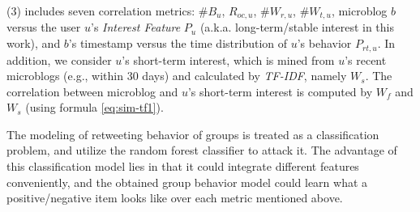 	\stab(3)  includes seven correlation metrics: \#$B_u$, $R_{oc,u}$, \#$W_{r,u}$, \#$W_{t,u}$, microblog $b$ versus the user $u$'s \textit{Interest Feature} $P_u$ (a.k.a. long-term/stable interest in this work), and $b$'s timestamp versus the time distribution of $u$'s \retg{} behavior $P_{rt,u}$.
In addition, we consider $u$'s short-term interest, which is mined from $u$'s recent microblogs (e.g., within 30 days) and calculated by \textit{TF-IDF}, namely $W_s$.
The correlation between microblog and $u$'s short-term interest is computed by $W_f$ and $W_s$ (using formula \ref{eq:sim-tf1}).

The modeling of retweeting behavior of groups is treated as a classification problem, and utilize the random forest classifier to attack it.
The advantage of this classification model lies in that it could integrate different features conveniently, and
the obtained group behavior model could learn what a positive/negative item looks like over each metric mentioned above.











